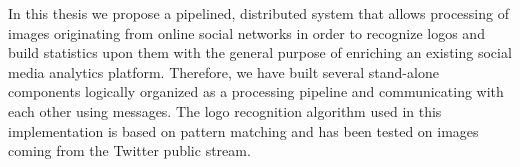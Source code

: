 
In this thesis we propose a pipelined, distributed system that allows
processing of images originating from online social networks in order to
recognize logos and build statistics upon them with the general purpose of
enriching an existing social media analytics platform. Therefore, we have built
several stand-alone components logically organized as a processing pipeline
and communicating with each other using messages. The logo recognition
algorithm used in this implementation is based on pattern matching and has
been tested on images coming from the Twitter public stream.
